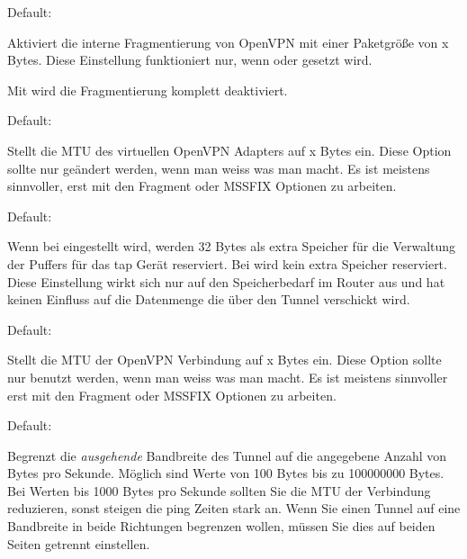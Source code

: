\begin{description}

  Default: 

  Aktiviert die interne Fragmentierung von OpenVPN mit einer
  Paketgröße von x Bytes. Diese Einstellung funktioniert nur, wenn
   oder  gesetzt wird.

  Mit  wird die Fragmentierung komplett deaktiviert.


  Default: 

  Stellt die MTU des virtuellen OpenVPN Adapters auf x Bytes
  ein. Diese Option sollte nur geändert werden, wenn man weiss was man
  macht. Es ist meistens sinnvoller, erst mit den Fragment oder MSSFIX
  Optionen zu arbeiten.


  Default: 

  Wenn bei  eingestellt wird,
  werden 32 Bytes als extra Speicher für die Verwaltung der Puffers
  für das tap Gerät reserviert. Bei
   wird kein extra Speicher
  reserviert. Diese Einstellung wirkt sich nur auf den Speicherbedarf
  im Router aus und hat keinen Einfluss auf die Datenmenge die über
  den Tunnel verschickt wird.


  Default: 

  Stellt die MTU der OpenVPN Verbindung auf x Bytes ein. Diese Option
  sollte nur benutzt werden, wenn man weiss was man macht. Es ist
  meistens sinnvoller erst mit den Fragment oder MSSFIX Optionen zu
  arbeiten.


  Default: 

  Begrenzt die \emph{ausgehende} Bandbreite des Tunnel auf die
  angegebene Anzahl von Bytes pro Sekunde. Möglich sind Werte von 100
  Bytes bis zu 100000000 Bytes. Bei Werten bis 1000 Bytes pro Sekunde
  sollten Sie die MTU der Verbindung reduzieren, sonst steigen die
  ping Zeiten stark an. Wenn Sie einen Tunnel auf eine Bandbreite in
  beide Richtungen begrenzen wollen, müssen Sie dies auf beiden Seiten
  getrennt einstellen.


\end{description}
